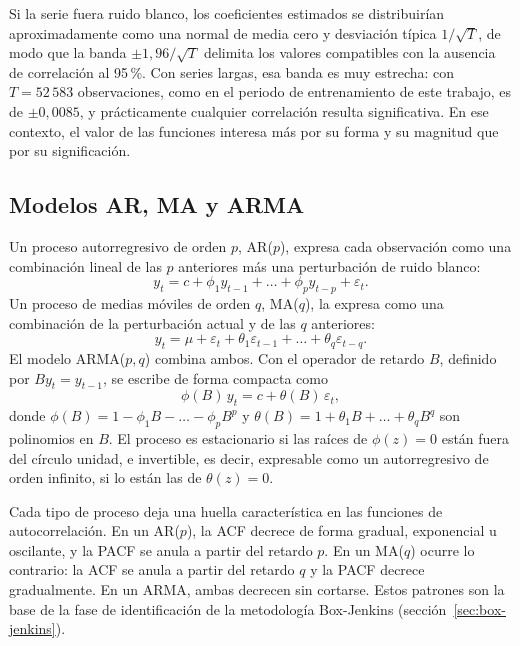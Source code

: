 Si la serie fuera ruido blanco, los coeficientes estimados se distribuirían
aproximadamente como una normal de media cero y desviación típica
$1/\sqrt{T}$, de modo que la banda $\pm 1{,}96/\sqrt{T}$ delimita los valores
compatibles con la ausencia de correlación al 95\,\%. Con series largas, esa
banda es muy estrecha: con $T = 52\,583$ observaciones, como en el periodo de
entrenamiento de este trabajo, es de $\pm 0{,}0085$, y prácticamente
cualquier correlación resulta significativa. En ese contexto, el valor de
las funciones interesa más por su forma y su magnitud que por su
significación.

\subsection{Modelos AR, MA y ARMA}\label{sec:arma}

Un proceso autorregresivo de orden $p$, AR($p$), expresa cada observación
como una combinación lineal de las $p$ anteriores más una perturbación de
ruido blanco:
\begin{equation}
	y_t = c + \phi_1 y_{t-1} + \dots + \phi_p y_{t-p} + \varepsilon_t.
\end{equation}
Un proceso de medias móviles de orden $q$, MA($q$), la expresa como una
combinación de la perturbación actual y de las $q$ anteriores:
\begin{equation}
	y_t = \mu + \varepsilon_t + \theta_1 \varepsilon_{t-1} + \dots + \theta_q \varepsilon_{t-q}.
\end{equation}
El modelo ARMA($p,q$) combina ambos. Con el operador de retardo $B$, definido
por $B y_t = y_{t-1}$, se escribe de forma compacta como
\begin{equation}
	\phi(B)\, y_t = c + \theta(B)\, \varepsilon_t,
\end{equation}
donde $\phi(B) = 1 - \phi_1 B - \dots - \phi_p B^p$ y
$\theta(B) = 1 + \theta_1 B + \dots + \theta_q B^q$ son polinomios en $B$.
El proceso es estacionario si las raíces de $\phi(z) = 0$ están fuera del
círculo unidad, e invertible, es decir, expresable como un autorregresivo de
orden infinito, si lo están las de $\theta(z) = 0$.

Cada tipo de proceso deja una huella característica en las funciones de
autocorrelación. En un AR($p$), la ACF decrece de forma gradual, exponencial
u oscilante, y la PACF se anula a partir del retardo $p$. En un MA($q$)
ocurre lo contrario: la ACF se anula a partir del retardo $q$ y la PACF
decrece gradualmente. En un ARMA, ambas decrecen sin cortarse. Estos patrones
son la base de la fase de identificación de la metodología Box-Jenkins
(sección~\ref{sec:box-jenkins}).

